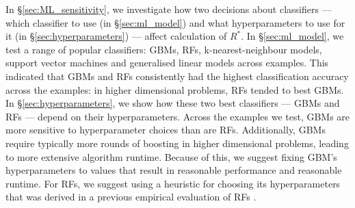 \documentclass[ba]{imsart}
\numberwithin{equation}{section}
\theoremstyle{plain}
\begin{document}
In \S\ref{sec:ML_sensitivity}, we investigate how two decisions about classifiers — which classifier to use (in \S\ref{sec:ml_model}) and what hyperparameters to use for it (in \S\ref{sec:hyperparameters}) — affect calculation of $R^*$. In \S\ref{sec:ml_model}, we test a range of popular classifiers: GBMs, RFs, k-nearest-neighbour models, support vector machines and generalised linear models across examples. This indicated that GBMs and RFs consistently had the highest classification accuracy across the examples: in higher dimensional problems, RFs tended to best GBMs. In \S\ref{sec:hyperparameters}, we show how these two best classifiers — GBMs and RFs — depend on their hyperparameters. Across the examples we test, GBMs are more sensitive to hyperparameter choices than are RFs. Additionally, GBMs require typically more rounds of boosting in higher dimensional problems, leading to more extensive algorithm runtime. Because of this, we suggest fixing GBM's hyperparameters to values that result in reasonable performance and reasonable runtime. For RFs, we suggest using a heuristic for choosing its hyperparameters that was derived in a previous empirical evaluation of RFs \citep{bernard2009influence}.
\end{document}
